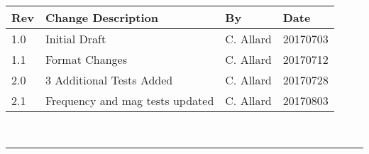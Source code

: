 \documentclass[]{BasiliskReportMemo}
\begin{document}
\makeCover

%
%
\pagestyle{empty}
{\renewcommand{\arraystretch}{2}
\noindent
\begin{longtable}{|p{0.5in}|p{3.5in}|p{1.07in}|p{0.9in}|}
\hline
{\bfseries Rev} & {\bfseries Change Description} & {\bfseries By}& {\bfseries Date} \\
\hline
1.0 & Initial Draft & C. Allard & 20170703\\
\hline
1.1 & Format Changes & C. Allard & 20170712\\
\hline
2.0 & 3 Additional Tests Added & C. Allard & 20170728\\
\hline
2.1 & Frequency and mag tests updated & C. Allard & 20170803\\
\hline
\end{longtable}
}



\newpage
\setcounter{page}{1}
\pagestyle{fancy}

\tableofcontents %
~\\ \hrule ~\\ %










	














\end{document}
